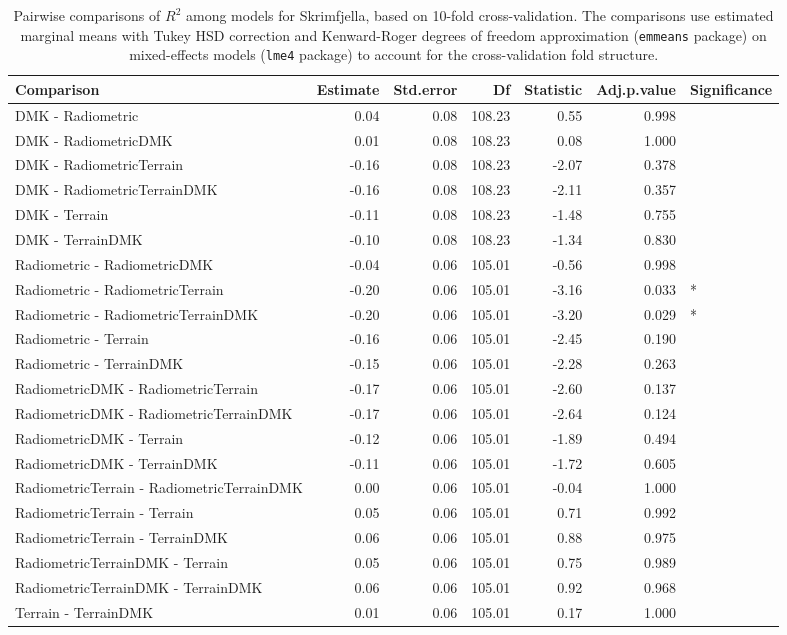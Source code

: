 \documentclass[soil, manuscript]{copernicus}
\begin{document}
\begin{table}[h]
\caption{\label{tab:pairwiseSkrimRsq}Pairwise comparisons of $R^2$ among models for Skrimfjella, based on 10-fold cross-validation. The comparisons use estimated marginal means with Tukey HSD correction and Kenward-Roger degrees of freedom approximation (\texttt{emmeans} package) on mixed-effects models (\texttt{lme4} package) to account for the cross-validation fold structure.}
\centering
\begin{tabular}[t]{lrrrrrl}
\hline
Comparison & Estimate & Std.error & Df & Statistic & Adj.p.value & Significance\\
\hline
DMK - Radiometric & 0.04 & 0.08 & 108.23 & 0.55 & 0.998 & \\
DMK - RadiometricDMK & 0.01 & 0.08 & 108.23 & 0.08 & 1.000 & \\
DMK - RadiometricTerrain & -0.16 & 0.08 & 108.23 & -2.07 & 0.378 & \\
DMK - RadiometricTerrainDMK & -0.16 & 0.08 & 108.23 & -2.11 & 0.357 & \\
DMK - Terrain & -0.11 & 0.08 & 108.23 & -1.48 & 0.755 & \\
DMK - TerrainDMK & -0.10 & 0.08 & 108.23 & -1.34 & 0.830 & \\
Radiometric - RadiometricDMK & -0.04 & 0.06 & 105.01 & -0.56 & 0.998 & \\
Radiometric - RadiometricTerrain & -0.20 & 0.06 & 105.01 & -3.16 & 0.033 & *\\
Radiometric - RadiometricTerrainDMK & -0.20 & 0.06 & 105.01 & -3.20 & 0.029 & *\\
Radiometric - Terrain & -0.16 & 0.06 & 105.01 & -2.45 & 0.190 & \\
Radiometric - TerrainDMK & -0.15 & 0.06 & 105.01 & -2.28 & 0.263 & \\
RadiometricDMK - RadiometricTerrain & -0.17 & 0.06 & 105.01 & -2.60 & 0.137 & \\
RadiometricDMK - RadiometricTerrainDMK & -0.17 & 0.06 & 105.01 & -2.64 & 0.124 & \\
RadiometricDMK - Terrain & -0.12 & 0.06 & 105.01 & -1.89 & 0.494 & \\
RadiometricDMK - TerrainDMK & -0.11 & 0.06 & 105.01 & -1.72 & 0.605 & \\
RadiometricTerrain - RadiometricTerrainDMK & 0.00 & 0.06 & 105.01 & -0.04 & 1.000 & \\
RadiometricTerrain - Terrain & 0.05 & 0.06 & 105.01 & 0.71 & 0.992 & \\
RadiometricTerrain - TerrainDMK & 0.06 & 0.06 & 105.01 & 0.88 & 0.975 & \\
RadiometricTerrainDMK - Terrain & 0.05 & 0.06 & 105.01 & 0.75 & 0.989 & \\
RadiometricTerrainDMK - TerrainDMK & 0.06 & 0.06 & 105.01 & 0.92 & 0.968 & \\
Terrain - TerrainDMK & 0.01 & 0.06 & 105.01 & 0.17 & 1.000 & \\
\hline
\end{tabular}
\end{table}
\clearpage
\end{document}

